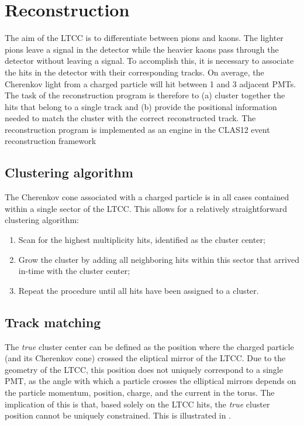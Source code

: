 \section{Reconstruction}

The aim of the LTCC is to differentiate between pions and kaons. The lighter pions
leave a signal in the detector while the heavier kaons pass through the detector without
leaving a signal.
To accomplish this, it is necessary to associate the hits in the detector with their
corresponding tracks.
On average, the Cherenkov light from a charged particle will hit between 1 and 3
adjacent PMTs.
The task of the reconstruction program is therefore to (a) cluster together the hits that
belong to a single track and (b) provide the positional information needed to match the
cluster with the correct reconstructed track.
The reconstruction program is implemented as an engine in the CLAS12 event reconstruction framework \cite{reco2019}

\subsection{Clustering algorithm}
The Cherenkov cone associated with a charged particle is in all cases contained within a
single sector of the LTCC. This allows for a relatively straightforward clustering
algorithm:
\begin{enumerate}
	\item Scan for the highest multiplicity hits, identified as the cluster center;
    \item Grow the cluster by adding all neighboring hits within this sector that arrived
		  in-time with the cluster center;
    \item Repeat the procedure until all hits have been assigned to a cluster.
\end{enumerate}

\subsection{Track matching}

The \textit{true} cluster center can be defined as the position where the charged particle
(and its Cherenkov cone) crossed the eliptical mirror of the LTCC.
Due to the geometry of the LTCC, this position does not uniquely correspond to a single
PMT, as the angle with which a particle crosses the elliptical mirrors depends on the
particle momentum, position, charge, and the current in the torus.
The implication of this is that, based solely on the LTCC hits, the \textit{true} cluster
position cannot be uniquely constrained.
This is illustrated in .

